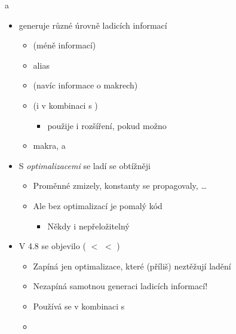 \begin{frame}{ a }

  \begin{itemize}
    \item {} generuje různé úrovně ladicích informací
    \begin{itemize}
      \item {} (méně informací)
      \item {} alias 
      \item {} (navíc informace o makrech)

      \pause

      \item {} (i v kombinaci s )
      \begin{itemize}
	\item {} použije i  rozšíření, pokud možno
      \end{itemize}

      \pause

      \item {} makra,  a \ifpbbin
	 \else {} \fi
    \end{itemize}

    \pause

    \item S \emph{optimalizacemi} se ladí se obtížněji
    \begin{itemize}
      \item Proměnné zmizely, konstanty se propagovaly, \dots

      \pause

      \item Ale bez optimalizací je pomalý kód
      \begin{itemize}
	\item Někdy i nepřeložitelný
      \end{itemize}
    \end{itemize}

    \pause

    \item V  4.8 se objevilo  ( $<$  $<$
      )
    \begin{itemize}
      \item Zapíná jen optimalizace, které (příliš) neztěžují ladění
      \item Nezapíná samotnou generaci ladicích informací!
      \item Používá se v kombinaci s 

      \pause

      \item {} 
    \end{itemize}
  \end{itemize}

\end{frame}

